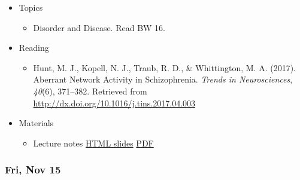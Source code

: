 \documentclass[]{article}
\providecommand{\tightlist}{%
  \setlength{\itemsep}{0pt}\setlength{\parskip}{0pt}}
\begin{document}
\begin{itemize}
\tightlist
\item
  Topics

  \begin{itemize}
  \tightlist
  \item
    Disorder and Disease. Read BW 16.
  \end{itemize}
\item
  Reading

  \begin{itemize}
  \tightlist
  \item
    Hunt, M. J., Kopell, N. J., Traub, R. D., \& Whittington, M. A.
    (2017). Aberrant Network Activity in Schizophrenia. \emph{Trends in
    Neurosciences}, \emph{40}(6), 371--382. Retrieved from
    \url{http://dx.doi.org/10.1016/j.tins.2017.04.003}
  \end{itemize}
\item
  Materials

  \begin{itemize}
  \tightlist
  \item
    Lecture notes \textbar{} \href{}{HTML slides} \textbar{}
    \href{}{PDF}
  \end{itemize}
\end{itemize}

\hypertarget{fri-nov-15}{%
\subsubsection{Fri, Nov 15}\label{fri-nov-15}}
\end{document}
